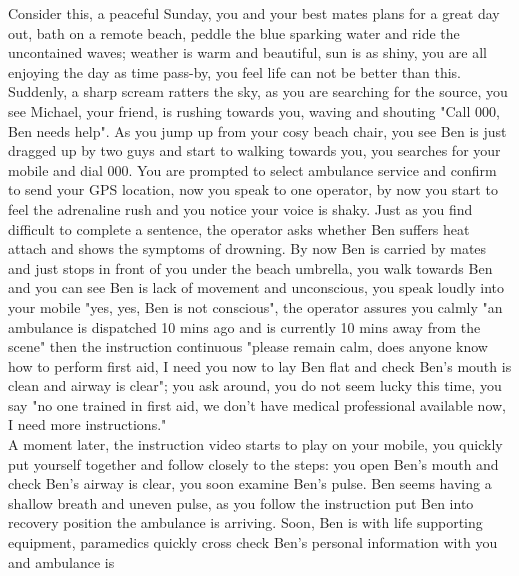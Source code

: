 Consider this, a peaceful Sunday, you and your best mates plans for a great day out, bath on a remote beach, peddle the blue sparking water and ride the uncontained waves; weather is warm and beautiful, sun is as shiny, you are all enjoying the day as time pass-by, you feel life can not be better than this. Suddenly, a sharp scream ratters the sky, as you are searching for the source, you see Michael, your friend, is rushing towards you, waving and shouting "Call 000, Ben needs help". As you jump up from your cosy beach chair, you see Ben is just dragged up by two guys and start to walking towards you, you searches for your mobile and dial 000. You are prompted to select ambulance service and confirm to send your GPS location, now you speak to one operator, by now you start to feel the adrenaline rush and you notice your voice is shaky. Just as you find difficult to complete a sentence, the operator asks whether Ben suffers heat attach and shows the symptoms of drowning. By now Ben is carried by mates and just stops in front of you under the beach umbrella, you walk towards Ben and you can see Ben is lack of movement and unconscious, you speak loudly into your mobile "yes, yes, Ben is not conscious", the operator assures you calmly "an ambulance is dispatched 10 mins ago and is currently 10 mins away from the scene" then the instruction continuous "please remain calm, does anyone know how to perform first aid, I need you now to lay Ben flat and check Ben's mouth is clean and airway is clear"; you ask around, you do not seem lucky this time, you say "no one trained in first aid, we don't have medical professional available now, I need more instructions." \\
A moment later, the instruction video starts to play on your mobile, you quickly put yourself together and follow closely to the steps: you open Ben's mouth and check Ben's airway is clear, you soon examine Ben's pulse. Ben seems having a shallow breath and uneven pulse, as you follow the instruction put Ben into recovery position the ambulance is arriving. Soon, Ben is with life supporting equipment, paramedics quickly cross check Ben's personal information with you and ambulance is 